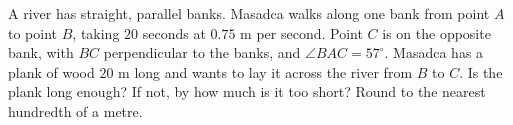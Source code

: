 A river has straight, parallel banks. Masadca walks along one bank from point $A$ to point $B$, taking $20$ seconds at $0.75$ m per second. Point $C$ is on the opposite bank, with $BC$ perpendicular to the banks, and $\angle BAC=57^\circ$. Masadca has a plank of wood $20$ m long and wants to lay it across the river from $B$ to $C$. Is the plank long enough? If not, by how much is it too short? Round to the nearest hundredth of a metre.

